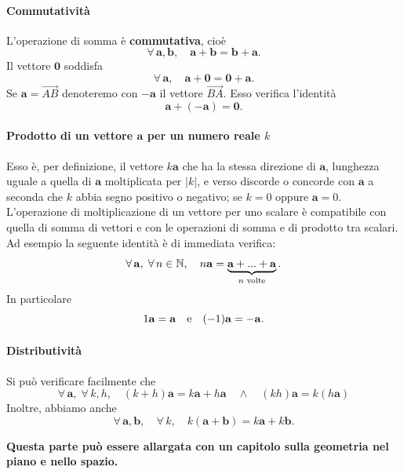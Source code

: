\documentclass{article}
\theoremstyle{plain}
\theoremstyle{definition}
\theoremstyle{remark}
\begin{document}
\vspace{10pt}

\paragraph{Commutatività}
L'operazione di somma è \textbf{commutativa}, cioè
\[\forall\,\mathbf{a},\mathbf{b},\quad\mathbf{a}+\mathbf{b}=\mathbf{b}+\mathbf{a}.\]
Il vettore $\mathbf{0}$ soddisfa 
\[\forall\,\mathbf{a},\quad\mathbf{a}+\mathbf{0}=\mathbf{0}+\mathbf{a}.\]
Se $\mathbf{a}=\overrightarrow{AB}$ denoteremo con $-\mathbf{a}$ il vettore $\overrightarrow{BA}$.
Esso verifica l'identità
\[\mathbf{a}+(-\mathbf{a})=\mathbf{0}.\]

\vspace{10pt}

\paragraph{Prodotto di un vettore $\mathbf{a}$ per un numero reale $k$}
Esso è, per definizione, il vettore $k\mathbf{a}$ che ha la stessa direzione di $\mathbf{a}$, lunghezza uguale a quella di $\mathbf{a}$ moltiplicata per $|k|$, e verso discorde o concorde con $\mathbf{a}$ a seconda che $k$ abbia segno positivo o negativo; se $k=0$ oppure $\mathbf{a}=0$.
L'operazione di moltiplicazione di un vettore per uno scalare è compatibile con quella di somma di vettori e con le operazioni di somma e di prodotto tra scalari.
Ad esempio la seguente identità è di immediata verifica:
\[\forall\,\mathbf{a},\;\forall\,n\in\mathbb{N},\quad n\mathbf{a}=\underbrace{\mathbf{a}+...+\mathbf{a}}_{n\textup{ volte}}.\]
In particolare 
\[1\mathbf{a}=\mathbf{a}\quad\textup{e}\quad(-1)\mathbf{a}=-\mathbf{a}.\]

\vspace{10pt}

\paragraph{Distributività}
Si può verificare facilmente che 
\[\forall\,\mathbf{a},\;\forall\,k,h,\quad(k+h)\mathbf{a}=k\mathbf{a}+h\mathbf{a}\quad\land\quad (kh)\mathbf{a}=k(h\mathbf{a})\]
Inoltre, abbiamo anche
\[\forall\,\mathbf{a},\mathbf{b},\quad\forall\, k,\quad k(\mathbf{a}+\mathbf{b})=k\mathbf{a}+k\mathbf{b}.\]

\vspace{10pt}

\textbf{Questa parte può essere allargata con un capitolo sulla geometria nel piano e nello spazio.}
\end{document}
